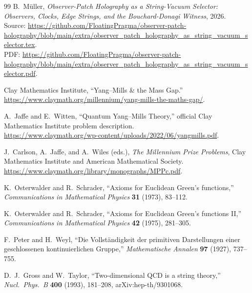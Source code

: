 \documentclass[11pt]{article}
\numberwithin{equation}{section}
\theoremstyle{remark}
\begin{document}
\begin{thebibliography}{99}
B.~M\"uller,
\emph{Observer-Patch Holography as a String-Vacuum Selector: Observers, Clocks, Edge Strings, and the Bouchard-Donagi Witness},
2026.\\
Source: \url{https://github.com/FloatingPragma/observer-patch-holography/blob/main/extra/observer_patch_holography_as_string_vacuum_selector.tex}.\\
PDF: \url{https://github.com/FloatingPragma/observer-patch-holography/blob/main/extra/observer_patch_holography_as_string_vacuum_selector.pdf}.

Clay Mathematics Institute,
``Yang--Mills \& the Mass Gap.''\\
\url{https://www.claymath.org/millennium/yang-mills-the-maths-gap/}.

A.~Jaffe and E.~Witten,
``Quantum Yang--Mills Theory,''
official Clay Mathematics Institute problem description.\\
\url{https://www.claymath.org/wp-content/uploads/2022/06/yangmills.pdf}.

J.~Carlson, A.~Jaffe, and A.~Wiles (eds.),
\emph{The Millennium Prize Problems},
Clay Mathematics Institute and American Mathematical Society.\\
\url{https://www.claymath.org/library/monographs/MPPc.pdf}.

K.~Osterwalder and R.~Schrader,
``Axioms for Euclidean Green's functions,''
\emph{Communications in Mathematical Physics} \textbf{31} (1973), 83--112.

K.~Osterwalder and R.~Schrader,
``Axioms for Euclidean Green's functions II,''
\emph{Communications in Mathematical Physics} \textbf{42} (1975), 281--305.

F.~Peter and H.~Weyl,
``Die Vollst\"andigkeit der primitiven Darstellungen einer geschlossenen kontinuierlichen Gruppe,''
\emph{Mathematische Annalen} \textbf{97} (1927), 737--755.

D.~J.~Gross and W.~Taylor,
``Two-dimensional QCD is a string theory,''
\emph{Nucl.\ Phys.\ B} \textbf{400} (1993), 181--208,
arXiv:hep-th/9301068.

\end{thebibliography}
\end{document}
